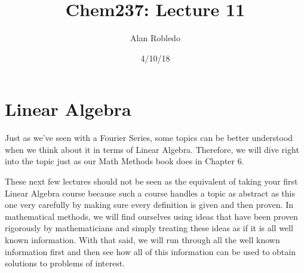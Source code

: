 \documentclass{article}
\title{Chem237: Lecture 11}
\date{4/10/18}
\author{Alan Robledo}
\begin{document}
\maketitle
\section*{Linear Algebra}
Just as we've seen with a Fourier Series, some topics can be better understood when we think about it in terms of Linear Algebra.
Therefore, we will dive right into the topic just as our Math Methods book does in Chapter 6.

These next few lectures should not be seen as the equivalent of taking your first Linear Algebra course because such a course handles a topic as abstract as this one very carefully by making sure every definition is given and then proven.
In mathematical methods, we will find ourselves using ideas that have been proven rigorously by mathematicians and simply treating these ideas as if it is all well known information.
With that said, we will run through all the well known information first and then see how all of this information can be used to obtain solutions to problems of interest.
\end{document}

